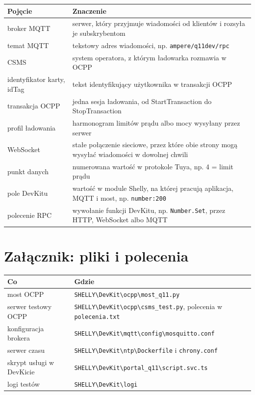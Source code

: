 \documentclass[11pt,a4paper]{article}
\begin{document}
\begin{longtable}{>{\raggedright\arraybackslash}p{2.67cm}>{\raggedright\arraybackslash}p{13.05cm}}
\toprule
\rowcolor{apteallight}\textbf{Pojęcie} & \textbf{Znaczenie} \\
\midrule\endhead
\bottomrule\endfoot
broker MQTT & serwer, który przyjmuje wiadomości od klientów i rozsyła je subskrybentom \\
temat MQTT & tekstowy adres wiadomości, np. \texttt{ampere/\allowbreak{}q11dev/\allowbreak{}rpc} \\
CSMS & system operatora, z którym ładowarka rozmawia w OCPP \\
identyfikator karty, idTag & tekst identyfikujący użytkownika w transakcji OCPP \\
transakcja OCPP & jedna sesja ładowania, od StartTransaction do StopTransaction \\
profil ładowania & harmonogram limitów prądu albo mocy wysyłany przez serwer \\
WebSocket & stałe połączenie sieciowe, przez które obie strony mogą wysyłać wiadomości w dowolnej chwili \\
punkt danych & numerowana wartość w protokole Tuya, np. 4 = limit prądu \\
pole DevKitu & wartość w module Shelly, na której pracują aplikacja, MQTT i most, np. \texttt{number:200} \\
polecenie RPC & wywołanie funkcji DevKitu, np. \texttt{Number.Set}, przez HTTP, WebSocket albo MQTT \\
\end{longtable}

\section*{Załącznik: pliki i polecenia}

\begin{longtable}{>{\raggedright\arraybackslash}p{4.43cm}>{\raggedright\arraybackslash}p{11.29cm}}
\toprule
\rowcolor{apteallight}\textbf{Co} & \textbf{Gdzie} \\
\midrule\endhead
\bottomrule\endfoot
most OCPP & \texttt{SHELLY\textbackslash{}DevKit\textbackslash{}ocpp\textbackslash{}most\_\allowbreak{}q11.\allowbreak{}py} \\
serwer testowy OCPP & \texttt{SHELLY\textbackslash{}DevKit\textbackslash{}ocpp\textbackslash{}csms\_\allowbreak{}test.\allowbreak{}py}, polecenia w \texttt{polecenia.\allowbreak{}txt} \\
konfiguracja brokera & \texttt{SHELLY\textbackslash{}DevKit\textbackslash{}mqtt\textbackslash{}config\textbackslash{}mosquitto.\allowbreak{}conf} \\
serwer czasu & \texttt{SHELLY\textbackslash{}DevKit\textbackslash{}ntp\textbackslash{}Dockerfile} i \texttt{chrony.conf} \\
skrypt usługi w DevKicie & \texttt{SHELLY\textbackslash{}DevKit\textbackslash{}portal\_\allowbreak{}q11\textbackslash{}script.\allowbreak{}svc.\allowbreak{}ts} \\
logi testów & \texttt{SHELLY\textbackslash{}DevKit\textbackslash{}logi} \\
\end{longtable}
\end{document}
